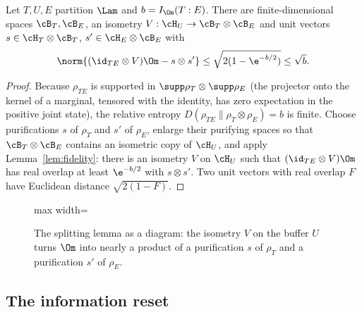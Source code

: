 \begin{lemma}[Splitting]\label{lem:splitting}
Let $T,U,E$ partition $\Lam$ and $b=I_\Om(T:E)$. There are finite-dimensional
spaces $\cB_T,\cB_E$, an isometry $V:\cH_U\to\cB_T\otimes\cB_E$ and unit vectors
$s\in\cH_T\otimes\cB_T$, $s'\in\cH_E\otimes\cB_E$ with
\[
 \norm{(\id_{TE}\otimes V)\Om-s\otimes s'}\le\sqrt{2(1-\e^{-b/2})}\le\sqrt b .
\]
\end{lemma}
\begin{proof}
Because $\rho_{TE}$ is supported in $\supp\rho_T\otimes\supp\rho_E$ (the
projector onto the kernel of a marginal, tensored with the identity, has
zero expectation in the positive joint state), the relative entropy
$D(\rho_{TE}\|\rho_T\otimes\rho_E)=b$ is finite. Choose purifications $s$
of $\rho_T$ and $s'$ of $\rho_E$, enlarge their purifying spaces so that
$\cB_T\otimes\cB_E$ contains an isometric copy of $\cH_U$, and apply
Lemma~\ref{lem:fidelity}: there is an isometry $V$ on $\cH_U$ such that
$(\id_{TE}\otimes V)\Om$ has real overlap at least $\e^{-b/2}$ with
$s\otimes s'$. Two unit vectors with real overlap $F$ have Euclidean
distance $\sqrt{2(1-F)}$.
\end{proof}

\begin{figure}[t]
\centering
\begin{adjustbox}{max width=\linewidth}

\end{adjustbox}
\caption{The splitting lemma as a diagram: the isometry $V$ on the buffer $U$ turns $\Om$ into nearly a product of a purification $s$ of $\rho_T$ and a purification $s'$ of $\rho_E$.}\label{fig:split}
\end{figure}

\subsection{The information reset}\label{sec:reset}

